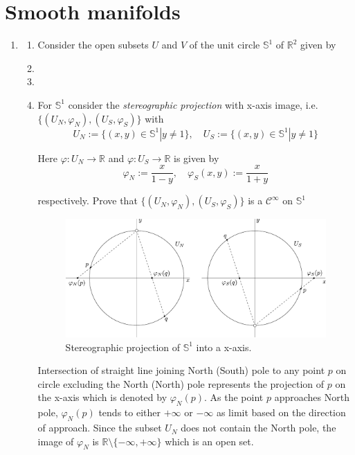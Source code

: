\documentclass{article}
\begin{document}
\section{Smooth manifolds}

\begin{enumerate}[start=13]
  \item
  \begin{enumerate}
    \item Consider the open subsets $U$ and $V$ of the unit circle $\mathbb{S}^{1}$ of $\mathbb{R}^{2}$ given by
    \item
    \item
    \item For $\mathbb{S}^{1}$ consider the \textit{stereographic projection} with x-axis image, i.e. $\{(U_{N},\varphi_{N}), (U_{S},\varphi_{S})\}$ with
    $$
    U_{N}:=\{(x,y)\in\mathbb{S}^{1}|y\neq1\},\quad U_{S}:=\{(x,y)\in\mathbb{S}^{1}|y\neq1\}
    $$

    Here $\varphi:U_{N}\to\mathbb{R}$ and $\varphi:U_{S}\to\mathbb{R}$ is given by
    $$
    \varphi_{N}:=\frac{x}{1-y},\quad\varphi_{S}(x,y):=\frac{x}{1+y}
    $$

    respectively. Prove that $\{(U_{N},\varphi_{N}),(U_{S},\varphi_{S})\}$ is a $\mathcal{C}^{\infty}$ on $\mathbb{S}^{1}$

    \begin{figure}
      \centering
      \label{fig:ex9}
      \includegraphics[scale=0.5]{assets/ex9.pdf}
      \caption{Stereographic projection of $\mathbb{S}^{1}$ into a x-axis.}
    \end{figure}

    \begin{ans_box}
      Intersection of straight line joining North (South) pole to any point $p$ on circle excluding the North (North) pole represents the projection of $p$ on the x-axis which is denoted by $\varphi_{N}(p)$. As the point $p$ approaches North pole, $\varphi_{N}(p)$ tends to either $+\infty$ or $-\infty$ as limit based on the direction of approach. Since the subset $U_{N}$ does not contain the North pole, the image of $\varphi_{N}$ is $\mathbb{R}\setminus\{-\infty,+\infty\}$ which is an open set.\medskip


\end{ans_box}
\end{enumerate}
\end{enumerate}
\end{document}
